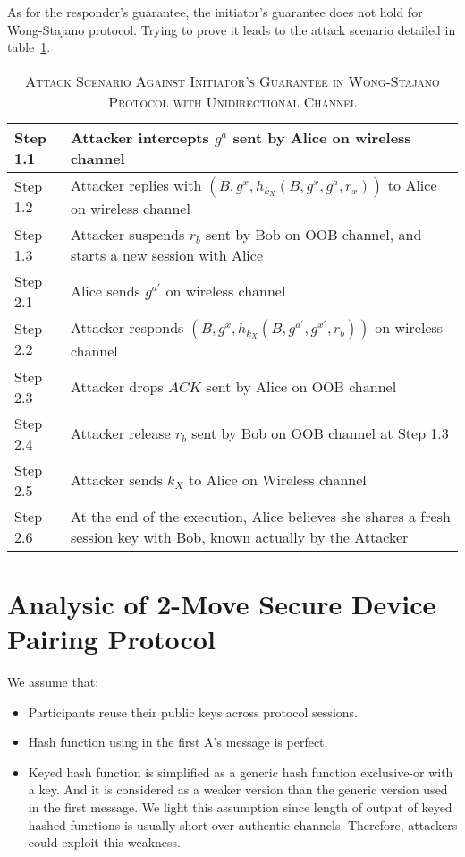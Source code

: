 As for the responder's guarantee, the initiator's guarantee does not hold for Wong-Stajano protocol. Trying to prove it leads to the attack scenario detailed in table~\ref{attack-initiator}. 

\begin{table}[t]
\centering
\caption{\textsc{Attack Scenario Against Initiator's Guarantee in Wong-Stajano Protocol with Unidirectional Channel}}
\label{attack-initiator}
{\small
\begin{tabular}{| l | p{11cm} |}
 \hline
 Step 1.1 & Attacker intercepts $g^{a}$ sent by Alice on wireless channel\\ \hline
 Step 1.2 & Attacker replies with $(B, g^{x}, h_{k_X}(B,g^{x},g^a,r_x))$ to Alice on wireless channel\\ \hline
 Step 1.3 & Attacker suspends $r_b$ sent by Bob on OOB channel, and starts a new session with Alice\\ \hline \hline
 Step 2.1 & Alice sends $g^{a'}$ on wireless channel\\ \hline
 Step 2.2 & Attacker responds $(B, g^{x}, h_{k_X}(B,g^{a'},g^{x'},r_b))$ on wireless channel\\ \hline
 Step 2.3 & Attacker drops $ACK$ sent by Alice on OOB channel\\ \hline
 Step 2.4 & Attacker release $r_b$ sent by Bob on OOB channel at Step 1.3\\ \hline
 Step 2.5 & Attacker sends $k_X$ to Alice on Wireless channel\\ \hline
 Step 2.6 & At the end of the execution, Alice believes she shares a fresh session key with Bob, known actually by the Attacker\\ \hline
\end{tabular}
}
\end{table}


\section{Analysic of 2-Move Secure Device Pairing Protocol}\label{chap42move}

We assume that:
\begin{itemize}
\item Participants reuse their public keys across protocol sessions. 
\item Hash function using in the first A's message is perfect. 
\item Keyed hash function is simplified as a generic hash function exclusive-or with a key. And it is considered as a weaker version than the generic version used in the first message. 
We light this assumption since length of output of keyed hashed functions is usually short over authentic channels. Therefore, attackers could exploit this weakness. 
\end{itemize}

